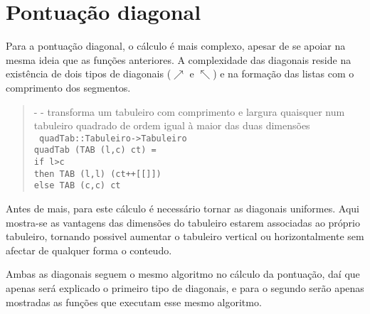 \documentclass[a4paper,titlepage]{scrreprt}
\begin{document}
	\section{Pontuação diagonal}
	Para a pontuação diagonal, o cálculo é mais complexo, apesar de se apoiar na mesma ideia que as funções anteriores. A complexidade das
	diagonais reside na existência de dois tipos de diagonais ($\nearrow$ e $\nwarrow$) e na formação das listas com o comprimento dos segmentos.
		\begin{quote}
			{\small - - transforma um tabuleiro com comprimento e largura quaisquer num tabuleiro quadrado de ordem igual à maior das duas dimensões\\}
			{\tt
			quadTab::Tabuleiro->Tabuleiro\\
			quadTab (TAB (l,c) ct) =\\
			if l>c\\
			then TAB (l,l) (ct++[[]])\\
			else TAB (c,c) ct
			}
		\end{quote}
	Antes de mais, para este cálculo é necessário tornar as diagonais uniformes. Aqui mostra-se as vantagens das dimensões do tabuleiro estarem
	associadas ao próprio tabuleiro, tornando possivel aumentar o tabuleiro vertical ou horizontalmente sem afectar de qualquer forma o conteudo.
	
	Ambas as diagonais seguem o mesmo algoritmo no cálculo da pontuação, daí que apenas será explicado o primeiro tipo de diagonais, e para o
	segundo serão apenas mostradas as funções que executam esse mesmo algoritmo.
\end{document}
